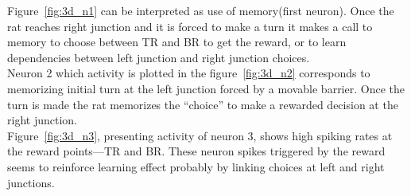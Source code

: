 \documentclass[11pt,a4paper,twocolumn]{article}
\begin{document}
Figure~\ref{fig:3d_n1} can be interpreted as use of memory(first neuron). Once the rat reaches right junction and it is forced to make a turn it makes a call to memory to choose between TR and BR to get the reward, or to learn dependencies between left junction and right junction choices.\\

Neuron 2 which activity is plotted in the figure~\ref{fig:3d_n2} corresponds to memorizing initial turn at the left junction forced by a movable barrier. Once the turn is made the rat memorizes the ``choice'' to make a rewarded decision at the right junction.\\

Figure~\ref{fig:3d_n3}, presenting activity of neuron 3, shows high spiking rates at the reward points---TR and BR. These neuron spikes triggered by the reward seems to reinforce learning effect probably by linking choices at left and right junctions.\\
\end{document}
